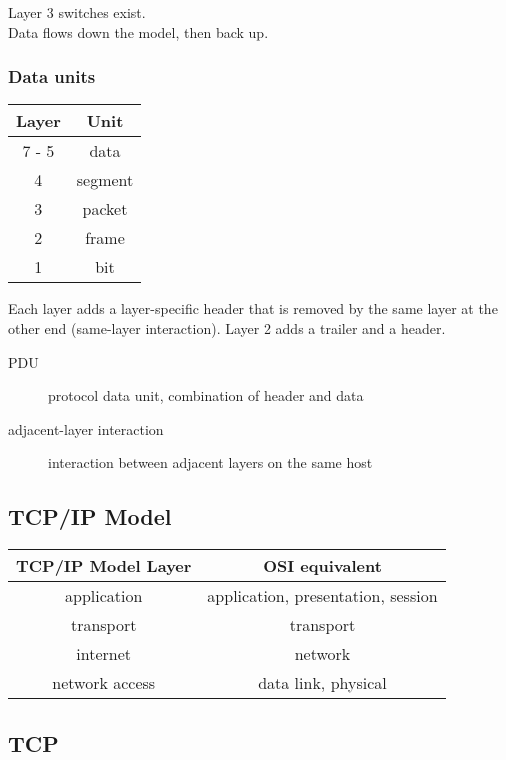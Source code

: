 Layer 3 switches exist.\\

Data flows down the model, then back up.

\subsubsection{Data units}

\begin{tabular}{ | c | c | }
\hline
Layer & Unit \\ \hline \hline
7 - 5 & data \\ \hline
4 & segment \\ \hline
3 & packet \\ \hline
2 & frame \\ \hline
1 & bit \\ \hline
\end{tabular}

Each layer adds a layer-specific header that is removed by the same layer at
the other end (same-layer interaction). Layer 2 adds a trailer and a header.

\begin{description}

\item[PDU]
protocol data unit, combination of header and data

\item[adjacent-layer interaction]
interaction between adjacent layers on the same host

\end{description}

\subsection{TCP/IP Model}

\begin{tabular}{ | c | c | }
\hline
TCP/IP Model Layer & OSI equivalent \\ \hline \hline
application & application, presentation, session \\ \hline
transport & transport \\ \hline
internet & network \\ \hline
network access & data link, physical\\ \hline
\end{tabular}

\subsection{TCP}

